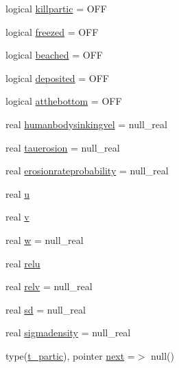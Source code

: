 \begin{DoxyCompactItemize}
logical \mbox{\hyperlink{structmodulelagrangianglobal_1_1t__partic_ae7584c30441150c09f47e4854df45b6a}{killpartic}} = O\+FF
\item 
logical \mbox{\hyperlink{structmodulelagrangianglobal_1_1t__partic_ac998e9239987ba63e8ab9ef433e66d69}{freezed}} = O\+FF
\item 
logical \mbox{\hyperlink{structmodulelagrangianglobal_1_1t__partic_aec8d7108182d247ccf836a3b6d8e4dbf}{beached}} = O\+FF
\item 
logical \mbox{\hyperlink{structmodulelagrangianglobal_1_1t__partic_a65973b9049df4cf21efc78afb2379350}{deposited}} = O\+FF
\item 
logical \mbox{\hyperlink{structmodulelagrangianglobal_1_1t__partic_a1ee37a9eb8d50dfc4c7d8989874fbab1}{atthebottom}} = O\+FF
\item 
real \mbox{\hyperlink{structmodulelagrangianglobal_1_1t__partic_ac4bfb883e4b794378748be33e69ccd39}{humanbodysinkingvel}} = null\+\_\+real
\item 
real \mbox{\hyperlink{structmodulelagrangianglobal_1_1t__partic_a0929daade86518c1da0d73322166c51b}{tauerosion}} = null\+\_\+real
\item 
real \mbox{\hyperlink{structmodulelagrangianglobal_1_1t__partic_a37e492cc341b6cf83d2aed5879ef11b4}{erosionrateprobability}} = null\+\_\+real
\item 
real \mbox{\hyperlink{structmodulelagrangianglobal_1_1t__partic_a406a013f8867dc4b11d2fcda7202a5ad}{u}}
\item 
real \mbox{\hyperlink{structmodulelagrangianglobal_1_1t__partic_a9d6fd4a775399ce0f59712026fc5e43c}{v}}
\item 
real \mbox{\hyperlink{structmodulelagrangianglobal_1_1t__partic_aee11ce09279afca50a39598251c981fe}{w}} = null\+\_\+real
\item 
real \mbox{\hyperlink{structmodulelagrangianglobal_1_1t__partic_a721a6f32001809f31f820a9a4b5e4b2b}{relu}}
\item 
real \mbox{\hyperlink{structmodulelagrangianglobal_1_1t__partic_a668e35eb063114cac27c5daff40b439f}{relv}} = null\+\_\+real
\item 
real \mbox{\hyperlink{structmodulelagrangianglobal_1_1t__partic_a6543100c9afb2b6334bb0445b437351a}{sd}} = null\+\_\+real
\item 
real \mbox{\hyperlink{structmodulelagrangianglobal_1_1t__partic_a89c2801daf4b5f4a145e1c1d8fb0f462}{sigmadensity}} = null\+\_\+real
\item 
type(\mbox{\hyperlink{structmodulelagrangianglobal_1_1t__partic}{t\+\_\+partic}}), pointer \mbox{\hyperlink{structmodulelagrangianglobal_1_1t__partic_a07142edb6696cc654743fc36ac91dd3f}{next}} =$>$ null()

\end{DoxyCompactItemize}
